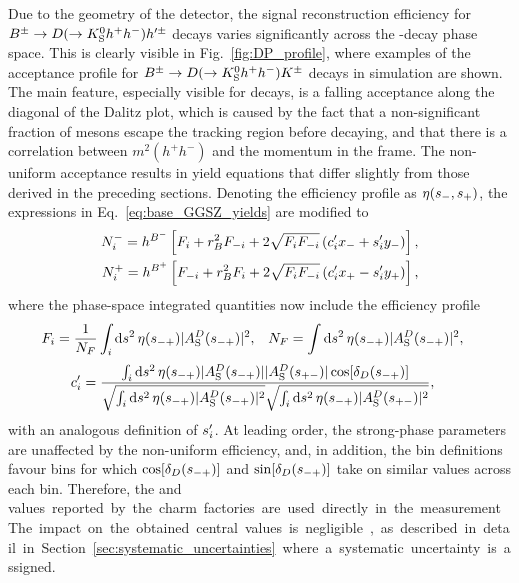 Due to the geometry of the \lhcb detector, the signal reconstruction efficiency for ${{B}^\pm}\rightarrow{\ensuremath{D}}(\rightarrow{\ensuremath{{K}^0_{\mathrm{S}}}} h^+h^-)h'^\pm$ decays varies significantly across the \D-decay phase space. This is clearly visible in Fig.~\ref{fig:DP_profile}, where examples of the acceptance profile for  ${{B}^\pm}\rightarrow{\ensuremath{D}}(\rightarrow{\ensuremath{{K}^0_{\mathrm{S}}}} h^+h^-){{K}^\pm}$ decays in \lhcb simulation are shown. The main feature, especially visible for \DtoKspipi decays, is a falling acceptance along the diagonal of the Dalitz plot, which is caused by the fact that a non-significant fraction of \KS mesons escape the \lhcb tracking region before decaying, and that there is a correlation between $m^2(h^+h^-)$ and the \KS momentum in the \lhcb frame. The non-uniform acceptance results in yield equations that differ slightly from those derived in the preceding sections. Denoting the efficiency profile as $\eta(s_-, s_+)$, the expressions in Eq.~\eqref{eq:base_GGSZ_yields} are modified to
\begin{align}
\begin{split}    \label{eq:lhcb_GGSZ_yields}
    N^-_i = h^{{{B}^-}} \left[F_i + r_{B}^2F_{-i} + 2\sqrt{F_iF_{-i}}\left(c_i'x_-+s_i'y_-\right)\right], \\
    N^+_i = h^{{{B}^+}} \left[F_{-i} + r_{B}^2F_i + 2\sqrt{F_iF_{-i}}\left(c_i'x_+-s_i'y_+\right)\right],
\end{split}
\end{align}
where the phase-space integrated quantities now include the efficiency profile
\begin{align}\label{eq:Fi_def}
    F_i &= \frac{1}{N_F}\int_i\text{d}s^2 \,\eta(s_{-+})|A_{\rm S}^{D}(s_{-+})|^2, &
    N_F &=\int\text{d}s^2 \,\eta(s_{-+})|A_{\rm S}^{D}(s_{-+})|^2,
\end{align}
\begin{align}\label{eq:ci_si_with_eff}
\begin{split}
    c_i' &= \frac
    {\int_i \text{d}s^2 \,\eta(s_{-+})|A_{\rm S}^{D}(s_{-+})||A_{\rm S}^{D}(s_{+-})|\cos[\delta_D(s_{-+})]}
    {\sqrt{\int_i \text{d}s^2 \,\eta(s_{-+})|A_{\rm S}^{D}(s_{-+})|^2}\sqrt{\int_i \text{d}s^2 \,\eta(s_{-+})|A_{\rm S}^{D}(s_{+-})|^2}},
\end{split}
\end{align}
with an analogous definition of $s_i'$. At leading order, the strong-phase parameters are unaffected by the non-uniform efficiency, and, in addition, the bin definitions favour bins for which $\cos[\delta_D(s_{-+})]$ and $\sin[\delta_D(s_{-+})]$ take on similar values across each bin.  Therefore, the  \ci and \si values reported by the charm factories are used directly in the measurement. The impact on the obtained central values is negligible, as described in detail in Section~\ref{sec:systematic_uncertainties} where a systematic uncertainty is assigned. 

